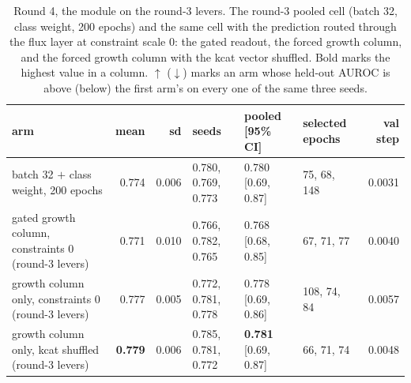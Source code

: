 \begin{table}[H]
  \centering
  \footnotesize
  \caption[Round 4, the module on the round-3 levers]{Round 4, the module on the round-3 levers. The round-3 pooled cell (batch 32, class weight, 200 epochs) and the same cell with the prediction routed through the flux layer at constraint scale 0: the gated readout, the forced growth column, and the forced growth column with the kcat vector shuffled. Bold marks the highest value in a column. $\uparrow$ ($\downarrow$) marks an arm whose held-out AUROC is above (below) the first arm's on every one of the same three seeds.}
  \label{tab:w15}
  \begin{tabular}{@{}lrrlllr@{}}
    \hline
    arm & mean & sd & seeds & pooled [95\% CI] & selected epochs & val step \\
    \hline
    batch 32 $+$ class weight, 200 epochs & 0.774 & 0.006 & 0.780, 0.769, 0.773 & 0.780 [0.69, 0.87] & 75, 68, 148 & 0.0031 \\
    gated growth column, constraints 0 (round-3 levers) & 0.771 & 0.010 & 0.766, 0.782, 0.765 & 0.768 [0.68, 0.85] & 67, 71, 77 & 0.0040 \\
    growth column only, constraints 0 (round-3 levers) & 0.777 & 0.005 & 0.772, 0.781, 0.778 & 0.778 [0.69, 0.86] & 108, 74, 84 & 0.0057 \\
    growth column only, kcat shuffled (round-3 levers) & \textbf{0.779} & 0.006 & 0.785, 0.781, 0.772 & \textbf{0.781} [0.69, 0.87] & 66, 71, 74 & 0.0048 \\
    \hline
  \end{tabular}
\end{table}
